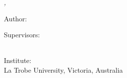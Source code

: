 \hfill
\vfill

\noindent \textit{\myTitle,} {\textcopyright} {\mySubmissionMonth} {\mySubmissionYear}

\bigskip

\noindent Author:\\
{\myFirstName} \textsc{\myLastName}

\medskip

\noindent Supervisors:\\
{\myProfTitle} {\myProfFirstName} \textsc{\myProfLastName}\\
{\myOtherProfTitle} {\myOtherProfFirstName} \textsc{\myOtherProfLastName}

\medskip

\noindent Institute:\\
La Trobe University, Victoria, Australia
